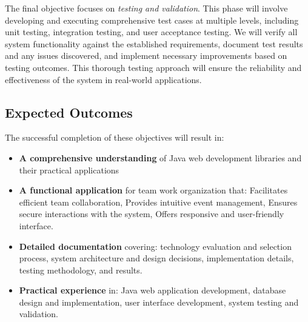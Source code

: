 The final objective focuses on \textit{testing and validation}.
This phase will involve developing and executing comprehensive test cases at multiple levels, including unit testing, integration testing, and user acceptance testing.
We will verify all system functionality against the established requirements, document test results and any issues discovered, and implement necessary improvements based on testing outcomes.
This thorough testing approach will ensure the reliability and effectiveness of the system in real-world applications.
\newpage

\subsection{Expected Outcomes}\label{subsec:expected-outcomes}
The successful completion of these objectives will result in:

\begin{itemize}
    \item \textbf{A comprehensive understanding} of Java web development libraries and their practical applications

    \item \textbf{A functional application} for team work organization that:
    Facilitates efficient team collaboration,
    Provides intuitive event management,
    Ensures secure interactions with the system,
    Offers responsive and user-friendly interface.


    \item \textbf{Detailed documentation} covering: technology evaluation and selection process,
    system architecture and design decisions,
    implementation details, testing methodology, and results.


    \item \textbf{Practical experience} in: Java web application development,
    database design and implementation,
    user interface development,
    system testing and validation.
\end{itemize}
